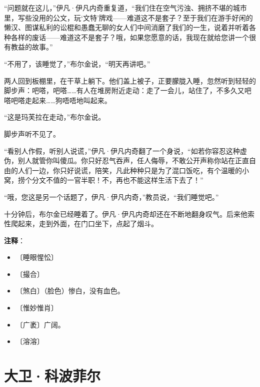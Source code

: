 \documentclass[12pt,UTF-8,openany]{ctexbook}
\begin{document}
\begin{normalsize}
    “问题就在这儿，”伊凡·伊凡内奇重复道，“我们住在空气污浊、拥挤不堪的城市里，写些没用的公文，玩‘文特’牌戏——难道这不是套子？至于我们在游手好闲的懒汉、图谋私利的讼棍和愚蠢无聊的女人们中间消磨了我们的一生，说着并听着各种各样的废话——难道这不是套子？哦，如果您愿意的话，我现在就给您讲一个很有教益的故事。”
    
    “不用了，该睡觉了，”布尔金说，“明天再讲吧。”
    
    两人回到板棚里，在干草上躺下。他们盖上被子，正要朦胧入睡，忽然听到轻轻的脚步声：吧嗒，吧嗒……有人在堆房附近走动：走了一会儿，站住了，不多久又吧嗒吧嗒走起来……狗唔唔地叫起来。
    
    “这是玛芙拉在走动，”布尔金说。
    
    脚步声听不见了。
    
    “看别人作假，听别人说谎，”伊凡·伊凡内奇翻了一个身说，“如若你容忍这种虚伪，别人就管你叫傻瓜。你只好忍气吞声，任人侮辱，不敢公开声称你站在正直自由的人们一边，你只好说谎，陪笑，凡此种种只是为了混口饭吃，有个温暖的小窝，捞个分文不值的一官半职！不，再也不能这样生活下去了！”
    
    “哦，您这是另一个话题了，伊凡·伊凡内奇，”教员说，“我们睡觉吧。”
    
    十分钟后，布尔金已经睡着了。伊凡·伊凡内奇却还在不断地翻身叹气。后来他索性爬起来，走到外面，在门口坐下，点起了烟斗。
    
\end{normalsize}


\newpage

\textbf{注释}：

\vspace{-1em}

\begin{itemize}
    \setlength\itemsep{-0.2em}
    \item 〔睡眼惺忪〕
    \item 〔撮合〕
    \item 〔煞白〕（脸色）惨白，没有血色。
    \item 〔惟妙惟肖〕
    \item 〔广袤〕广阔。
    \item 〔溶溶〕
\end{itemize}

\chapter{大卫·科波菲尔}
\end{document}
